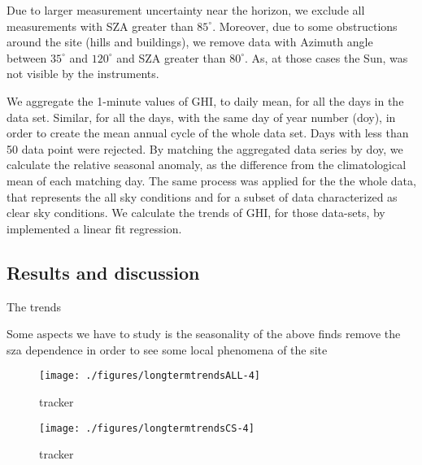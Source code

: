 \documentclass[
  11pt,
  a4paper,oneside]{article}
\begin{document}
Due to larger measurement uncertainty near the horizon, we exclude all measurements with SZA greater than \(85^\circ\). Moreover, due to some obstructions around the site (hills and buildings), we remove data with Azimuth angle between \(35^\circ\) and \(120^\circ\) and SZA greater than \(80^\circ\). As, at those cases the Sun, was not visible by the instruments.

We aggregate the 1-minute values of GHI, to daily mean, for all the days in the data set. Similar, for all the days, with the same day of year number (doy), in order to create the mean annual cycle of the whole data set. Days with less than 50 data point were rejected. By matching the aggregated data series by doy, we calculate the relative seasonal anomaly, as the difference from the climatological mean of each matching day. The same process was applied for the the whole data, that represents the all sky conditions and for a subset of data characterized as clear sky conditions. We calculate the trends of GHI, for those data-sets, by implemented a linear fit regression.

\hypertarget{results-and-discussion}{%
\subsection{Results and discussion}\label{results-and-discussion}}

The trends

Some aspects we have to study is the seasonality of the above finds remove the sza dependence in order to see some local phenomena of the site

\begin{figure}[!h]

{\centering \texttt{[image: ./figures/longtermtrendsALL-4]} 

}

\caption{tracker}\label{fig:alltrend}
\end{figure}

\begin{figure}[!h]

{\centering \texttt{[image: ./figures/longtermtrendsCS-4]} 

}

\caption{tracker}\label{fig:cleartrend}
\end{figure}
\end{document}
